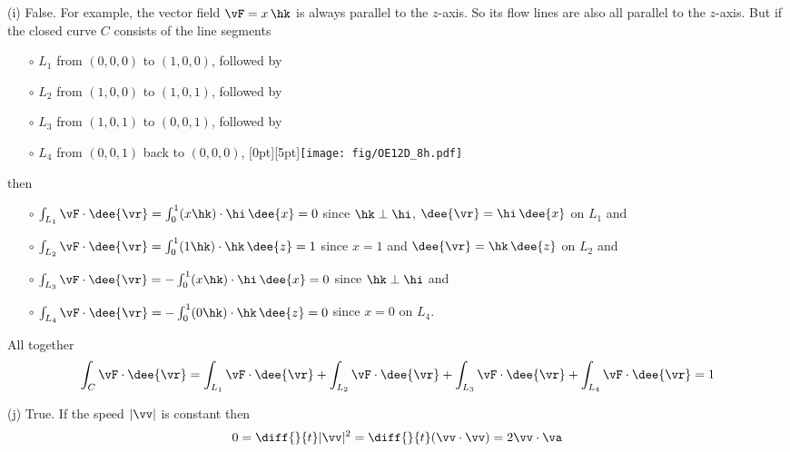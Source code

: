 \begin{solution}
\noindent (i)
False. For example, the vector field $\vF = x\,\hk$ is always parallel to the 
$z$-axis. So its flow lines are also all parallel to the $z$-axis.
But if the closed curve $C$ consists of the line segments
\begin{itemize}\itemsep1pt \parskip0pt  %
\item[$\circ$]
$L_1$ from $(0,0,0)$ to $(1,0,0)$, followed by
\item[$\circ$]
$L_2$ from $(1,0,0)$ to $(1,0,1)$, followed by
\item[$\circ$]
$L_3$ from $(1,0,1)$ to $(0,0,1)$, followed by
\item[$\circ$]
$L_4$ from $(0,0,1)$ back to $(0,0,0)$,
\hskip1.0in
\raisebox{-25pt}[0pt][5pt]{\texttt{[image: fig/OE12D\_8h.pdf]}}
\end{itemize} 
then
\begin{itemize}\itemsep1pt \parskip0pt  %
\item[$\circ$]
$\int_{L_1} \vF\cdot\dee{\vr} = \int_0^1 (x\hk)\cdot\hi\,\dee{x} = 0$
since $\hk\perp\hi$, $\dee{\vr}=\hi\,\dee{x}$ on $L_1$ and
\item[$\circ$]
$\int_{L_2} \vF\cdot\dee{\vr} = \int_0^1 (1\hk)\cdot\hk\,\dee{z} = 1$
since $x=1$ and $\dee{\vr}=\hk\,\dee{z}$ on $L_2$ and
\item[$\circ$]
$\int_{L_3} \vF\cdot\dee{\vr} = -\int_0^1 (x\hk)\cdot\hi\,\dee{x} = 0$
since $\hk\perp\hi$ and
\item[$\circ$]
$\int_{L_4} \vF\cdot\dee{\vr} = -\int_0^1 (0\hk)\cdot\hk\,\dee{z} = 0$
since $x=0$ on $L_4$.
\end{itemize} 
All together
\begin{equation*}
\int_{C} \vF\cdot\dee{\vr}
=\int_{L_1} \vF\cdot\dee{\vr}
+\int_{L_2} \vF\cdot\dee{\vr}
+\int_{L_3} \vF\cdot\dee{\vr}
+\int_{L_4} \vF\cdot\dee{\vr}
=1
\end{equation*}


\noindent (j) 
True. If the speed $|\vv|$ is constant then
\begin{align*}
0= \diff{\hfill}{t} |\vv|^2
= \diff{\hfill}{t} (\vv\cdot\vv)
= 2\vv\cdot\va
\end{align*}


\end{solution}


